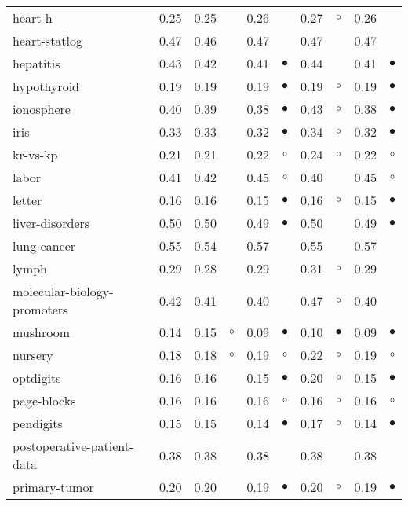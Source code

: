 {\begin{longtable}{lrr@{\hspace{0.1cm}}cr@{\hspace{0.1cm}}cr@{\hspace{0.1cm}}cr@{\hspace{0.1cm}}c}
heart-h & 0.25 & 0.25 &           & 0.26 &           & 0.27 &   $\circ$ & 0.26 &          \\
heart-statlog & 0.47 & 0.46 &           & 0.47 &           & 0.47 &           & 0.47 &          \\
hepatitis & 0.43 & 0.42 &           & 0.41 & $\bullet$ & 0.44 &           & 0.41 & $\bullet$\\
hypothyroid & 0.19 & 0.19 &           & 0.19 & $\bullet$ & 0.19 &   $\circ$ & 0.19 & $\bullet$\\
ionosphere & 0.40 & 0.39 &           & 0.38 & $\bullet$ & 0.43 &   $\circ$ & 0.38 & $\bullet$\\
iris & 0.33 & 0.33 &           & 0.32 & $\bullet$ & 0.34 &   $\circ$ & 0.32 & $\bullet$\\
kr-vs-kp & 0.21 & 0.21 &           & 0.22 &   $\circ$ & 0.24 &   $\circ$ & 0.22 &   $\circ$\\
labor & 0.41 & 0.42 &           & 0.45 &   $\circ$ & 0.40 &           & 0.45 &   $\circ$\\
letter & 0.16 & 0.16 &           & 0.15 & $\bullet$ & 0.16 &   $\circ$ & 0.15 & $\bullet$\\
liver-disorders & 0.50 & 0.50 &           & 0.49 & $\bullet$ & 0.50 &           & 0.49 & $\bullet$\\
lung-cancer & 0.55 & 0.54 &           & 0.57 &           & 0.55 &           & 0.57 &          \\
lymph & 0.29 & 0.28 &           & 0.29 &           & 0.31 &   $\circ$ & 0.29 &          \\
molecular-biology-promoters & 0.42 & 0.41 &           & 0.40 &           & 0.47 &   $\circ$ & 0.40 &          \\
mushroom & 0.14 & 0.15 &   $\circ$ & 0.09 & $\bullet$ & 0.10 & $\bullet$ & 0.09 & $\bullet$\\
nursery & 0.18 & 0.18 &   $\circ$ & 0.19 &   $\circ$ & 0.22 &   $\circ$ & 0.19 &   $\circ$\\
optdigits & 0.16 & 0.16 &           & 0.15 & $\bullet$ & 0.20 &   $\circ$ & 0.15 & $\bullet$\\
page-blocks & 0.16 & 0.16 &           & 0.16 &   $\circ$ & 0.16 &   $\circ$ & 0.16 &   $\circ$\\
pendigits & 0.15 & 0.15 &           & 0.14 & $\bullet$ & 0.17 &   $\circ$ & 0.14 & $\bullet$\\
postoperative-patient-data & 0.38 & 0.38 &           & 0.38 &           & 0.38 &           & 0.38 &          \\
primary-tumor & 0.20 & 0.20 &           & 0.19 & $\bullet$ & 0.20 &   $\circ$ & 0.19 & $\bullet$\\

\end{longtable}}
